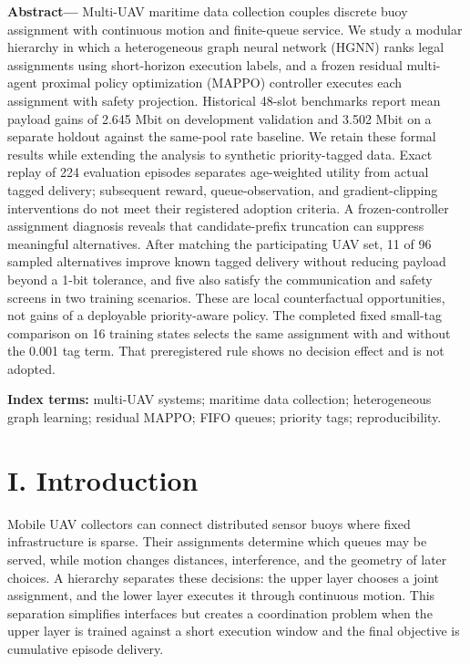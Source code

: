 
\noindent\textbf{Abstract---} Multi-UAV maritime data collection couples discrete buoy assignment with continuous motion and finite-queue service. We study a modular hierarchy in which a heterogeneous graph neural network (HGNN) ranks legal assignments using short-horizon execution labels, and a frozen residual multi-agent proximal policy optimization (MAPPO) controller executes each assignment with safety projection. Historical 48-slot benchmarks report mean payload gains of 2.645 Mbit on development validation and 3.502 Mbit on a separate holdout against the same-pool rate baseline. We retain these formal results while extending the analysis to synthetic priority-tagged data. Exact replay of 224 evaluation episodes separates age-weighted utility from actual tagged delivery; subsequent reward, queue-observation, and gradient-clipping interventions do not meet their registered adoption criteria. A frozen-controller assignment diagnosis reveals that candidate-prefix truncation can suppress meaningful alternatives. After matching the participating UAV set, 11 of 96 sampled alternatives improve known tagged delivery without reducing payload beyond a 1-bit tolerance, and five also satisfy the communication and safety screens in two training scenarios. These are local counterfactual opportunities, not gains of a deployable priority-aware policy. The completed fixed small-tag comparison on 16 training states selects the same assignment with and without the 0.001 tag term. That preregistered rule shows no decision effect and is not adopted.

\textbf{Index terms:} multi-UAV systems; maritime data collection; heterogeneous graph learning; residual MAPPO; FIFO queues; priority tags; reproducibility.

\section*{I. Introduction}

Mobile UAV collectors can connect distributed sensor buoys where fixed infrastructure is sparse. Their assignments determine which queues may be served, while motion changes distances, interference, and the geometry of later choices. A hierarchy separates these decisions: the upper layer chooses a joint assignment, and the lower layer executes it through continuous motion. This separation simplifies interfaces but creates a coordination problem when the upper layer is trained against a short execution window and the final objective is cumulative episode delivery.

